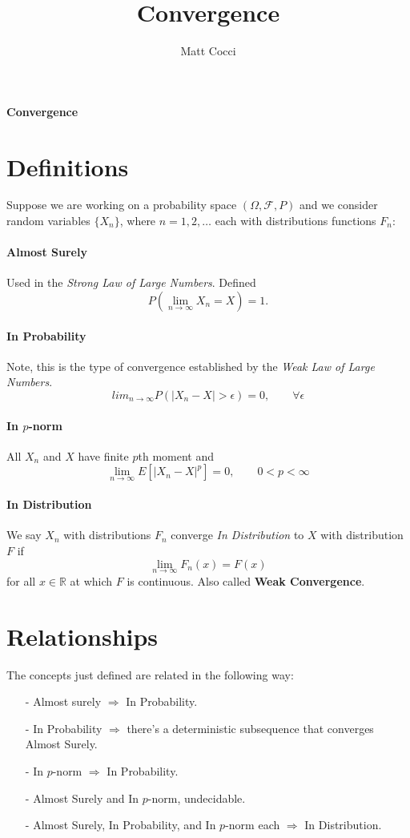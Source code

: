\documentclass[a4paper,12pt]{scrartcl}
\author{Matt Cocci}
\title{Convergence}
\date{}
\begin{document}
\begin{center}
   \LARGE
   \textbf{Convergence}
\end{center}

\section{Definitions}

Suppose we are working on a probability space $(\Omega, \mathcal{F},P)$
and we consider random variables $\{ X_n \}$, where $n=1,2,\ldots$ 
each with distributions functions $F_n$:

\paragraph{Almost Surely} Used in the \emph{Strong Law of Large Numbers}.
Defined
\[ P\left(\lim_{n\rightarrow\infty} X_n = X\right) =1.\]


\paragraph{In Probability} Note, this is the type of convergence established by the \emph{Weak Law of Large Numbers}.
\[ lim_{n\rightarrow\infty} 
P\left(|X_n - X| > \epsilon\right) = 0, \qquad \forall \epsilon \]

\paragraph{In $p$-norm} All $X_n$ and $X$ have finite $p$th moment
and 
\[ \lim_{n\rightarrow\infty} E\left[|X_n - X|^p\right] = 0, \qquad
   0<p<\infty \]

\paragraph{In Distribution} We say $X_n$ with distributions $F_n$ 
converge \emph{In Distribution} to $X$ with distribution $F$ if
   \[ \lim_{n\rightarrow\infty} F_n(x) = F(x) \]
for all $x \in \mathbb{R}$ at which $F$ is continuous. Also called
\textbf{Weak Convergence}.

\section{Relationships}

The concepts just defined are related in the following way:
\begin{itemize}
   \item[-]{Almost surely $\Rightarrow$ In Probability.}
   \item[-]{In Probability $\Rightarrow$ there's a deterministic 
      subsequence that converges Almost Surely.}
   \item[-]{In $p$-norm $\Rightarrow$ In Probability.}
   \item[-]{Almost Surely and In $p$-norm, undecidable.}
   \item[-]{Almost Surely, In Probability, and In $p$-norm each
      $\Rightarrow$ In Distribution.}
\end{itemize}
\end{document}
